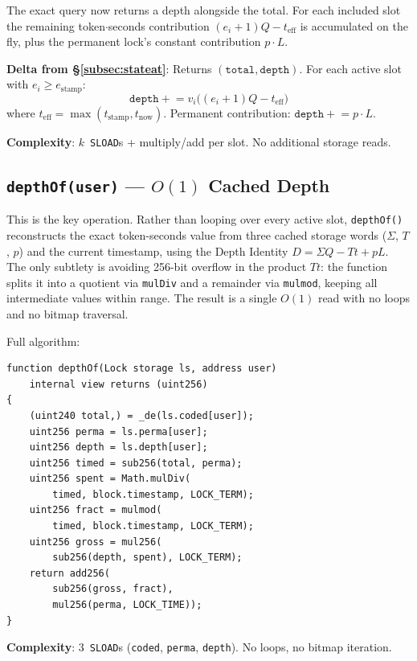 \documentclass[10pt,a4paper,twocolumn]{article}
\theoremstyle{definition}
\theoremstyle{plain}
\theoremstyle{remark}
\begin{document}
The exact query now returns a depth alongside the total.  For each included slot the remaining token$\cdot$seconds contribution $(e_i{+}1)Q - t_{\text{eff}}$ is accumulated on the fly, plus the permanent lock's constant contribution $p \cdot L$.

\textbf{Delta from \S\ref{subsec:stateat}}: Returns $(\texttt{total}, \texttt{depth})$. For each active slot with $e_i \geq e_{\text{stamp}}$:
\[
\texttt{depth} \mathrel{+}= v_i \bigl((e_i{+}1)Q - t_{\text{eff}}\bigr)
\]
where $t_{\text{eff}} = \max(t_{\text{stamp}}, t_{\text{now}})$. Permanent contribution: $\texttt{depth} \mathrel{+}= p \cdot L$.

\textbf{Complexity}: $k$~\texttt{SLOAD}s + multiply/add per slot. No additional storage reads.

\subsection{\texttt{depthOf(user)} --- $O(1)$ Cached Depth}
\label{subsec:depthof}

This is the key operation.  Rather than looping over every active slot, \texttt{depthOf()} reconstructs the exact token-seconds value from three cached storage words ($\Sigma$, $T$, $p$) and the current timestamp, using the Depth Identity $D = \Sigma Q - Tt + pL$.  The only subtlety is avoiding 256-bit overflow in the product $Tt$: the function splits it into a quotient via \texttt{mulDiv} and a remainder via \texttt{mulmod}, keeping all intermediate values within range.  The result is a single $O(1)$ read with no loops and no bitmap traversal.

Full algorithm:

\begin{lstlisting}[language=Solidity, caption={\texttt{depthOf} implementation}, label={lst:depthof}]
function depthOf(Lock storage ls, address user)
    internal view returns (uint256)
{
    (uint240 total,) = _de(ls.coded[user]);
    uint256 perma = ls.perma[user];
    uint256 depth = ls.depth[user];
    uint256 timed = sub256(total, perma);
    uint256 spent = Math.mulDiv(
        timed, block.timestamp, LOCK_TERM);
    uint256 fract = mulmod(
        timed, block.timestamp, LOCK_TERM);
    uint256 gross = mul256(
        sub256(depth, spent), LOCK_TERM);
    return add256(
        sub256(gross, fract),
        mul256(perma, LOCK_TIME));
}
\end{lstlisting}

\textbf{Complexity}: 3~\texttt{SLOAD}s (\texttt{coded}, \texttt{perma}, \texttt{depth}). No loops, no bitmap iteration.
\end{document}
